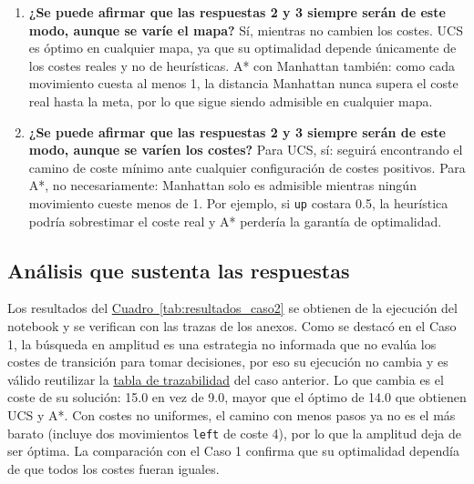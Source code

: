 \documentclass[12pt,a4paper]{article}
\begin{document}
\begin{enumerate}
\begin{itemize}
	\end{itemize}
  \item \textbf{¿Se puede afirmar que las respuestas 2 y 3 siempre serán de este modo, aunque se varíe el mapa?} Sí, mientras no cambien los costes. UCS es óptimo en cualquier mapa, ya que su optimalidad depende únicamente de los costes reales y no de heurísticas. A* con Manhattan también: como cada movimiento cuesta al menos 1, la distancia Manhattan nunca supera el coste real hasta la meta, por lo que sigue siendo admisible en cualquier mapa.
  \item \textbf{¿Se puede afirmar que las respuestas 2 y 3 siempre serán de este modo, aunque se varíen los costes?} Para UCS, sí: seguirá encontrando el camino de coste mínimo ante cualquier configuración de costes positivos. Para A*, no necesariamente: Manhattan solo es admisible mientras ningún movimiento cueste menos de 1. Por ejemplo, si \texttt{up} costara 0.5, la heurística podría sobrestimar el coste real y A* perdería la garantía de optimalidad.
\end{enumerate}

\subsection{Análisis que sustenta las respuestas}
Los resultados del \hyperref[tab:resultados_caso2]{Cuadro~\ref*{tab:resultados_caso2}} se obtienen de la ejecución del notebook y se verifican con las trazas de los anexos. Como se destacó en el Caso 1, la búsqueda en amplitud es una estrategia no informada que no evalúa los costes de transición para tomar decisiones, por eso su ejecución no cambia y es válido reutilizar la \hyperref[anx:amplitud_caso1_2]{tabla de trazabilidad} del caso anterior. Lo que cambia es el coste de su solución: 15.0 en vez de 9.0, mayor que el óptimo de 14.0 que obtienen UCS y A*. Con costes no uniformes, el camino con menos pasos ya no es el más barato (incluye dos movimientos \texttt{left} de coste 4), por lo que la amplitud deja de ser óptima. La comparación con el Caso 1 confirma que su optimalidad dependía de que todos los costes fueran iguales.
\end{document}
